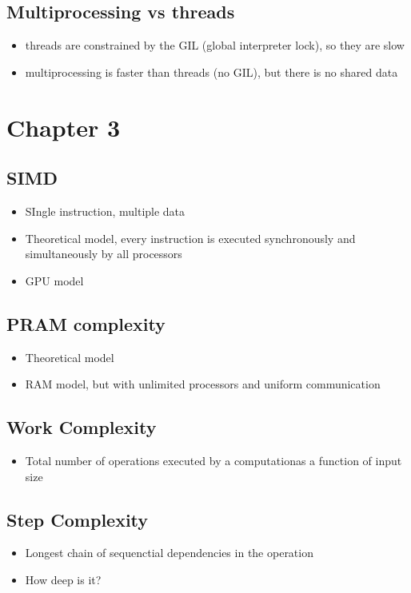 \documentclass{assignments}
\begin{document}
\subsection*{Multiprocessing vs threads}
\label{sec:orgb697649}
\begin{itemize}
\item threads are constrained by the GIL (global interpreter lock), so they are slow
\item multiprocessing is faster than threads (no GIL), but there is no shared data
\end{itemize}
\section*{Chapter 3}
\label{sec:org0f61140}
\subsection*{SIMD}
\label{sec:org4e8d5a9}
\begin{itemize}
\item SIngle instruction, multiple data
\item Theoretical model, every instruction is executed synchronously and
simultaneously by all processors
\item GPU model
\end{itemize}
\subsection*{PRAM complexity}
\label{sec:orgada38b8}
\begin{itemize}
\item Theoretical model
\item RAM model, but with unlimited processors and uniform communication
\end{itemize}
\subsection*{Work Complexity}
\label{sec:orgbb1c080}
\begin{itemize}
\item Total number of operations executed by a computationas a function of input size
\end{itemize}
\subsection*{Step Complexity}
\label{sec:orge345630}
\begin{itemize}
\item Longest chain of sequenctial dependencies in the operation
\item How deep is it?
\end{itemize}
\end{document}
